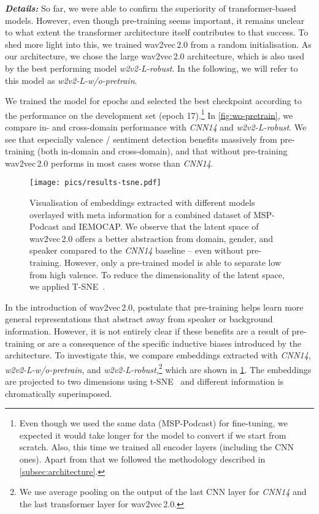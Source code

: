 \documentclass{article}
\newcommand\cnn{\mbox{\emph{CNN14}}}
\newcommand\wrobust{\mbox{\emph{w2v2-L-robust}}}
\newcommand\wwopre{\mbox{\emph{w2v2-L-w/o-pretrain}}}
\newcommand\msppodcast{\mbox{MSP-Podcast}}
\newcommand\iemocap{\mbox{IEMOCAP}}
\newcommand{\wtov}{wav2vec\,2.0}
\begin{document}
\noindent
\emph{\textbf{Details:}}
So far,
we were able to confirm the superiority of transformer-based models.
However, even though pre-training seems important,
it remains unclear to what extent the transformer architecture itself contributes to that success. 
To shed more light into this, we trained {\wtov} from a random initialisation. 
As our architecture,
we chose the large {\wtov} architecture,
which is also used by the best performing model {\wrobust}. 
In the following, we will refer to this model as {\wwopre}. 

We trained the model for  epochs
and selected the best checkpoint
according to the performance on the development set (epoch 17).\footnote{
Even though we used the same data ({\msppodcast}) for fine-tuning,
we expected it would take longer for the model to convert if we start from scratch.
Also, this time we trained all encoder layers (including the CNN ones). 
Apart from that we followed the methodology described in \cref{subsec:architecture}.
}
In \cref{fig:wo-pretrain},
we compare in- and cross-domain performance with {\cnn} and {\wrobust}. 
We see that especially valence / sentiment detection benefits massively from pre-training
(both in-domain and cross-domain),
and that without pre-training {\wtov} performs in most cases worse than {\cnn}.

\begin{figure}[t]
    \centering
    \texttt{[image: pics/results-tsne.pdf]}
    \caption{
        Visualisation of embeddings extracted with different models overlayed with meta information for a combined dataset of {\msppodcast} and {\iemocap}. 
        We observe that the latent space of {\wtov} offers a better abstraction from domain, gender,  and speaker compared to the {\cnn} baseline -- even without pre-training. 
        However, only a pre-trained model is able to separate low from high valence. 
        To reduce the dimensionality of the latent space, we applied T-SNE~\citep{maaten2008tsne}.
    }
    \label{fig:embeddings}
\end{figure}

In the introduction of {\wtov}, \citet{baevski2020wav2vec} postulate
that  pre-training helps learn more general representations
that abstract away from speaker or background information.
However, it is not entirely clear
if these benefits are a result of pre-training
or are a consequence of the specific inductive biases introduced by the architecture.
To investigate this,
we compare embeddings extracted with {\cnn}, {\wwopre}, and {\wrobust},\footnote{
We use average pooling on the output of the last CNN layer for {\cnn}
and the last transformer layer for {\wtov}.
}
which are shown in \cref{fig:embeddings}.
The embeddings are projected to two dimensions using t-SNE~\citep{maaten2008tsne}
and different information is chromatically superimposed.
\end{document}

